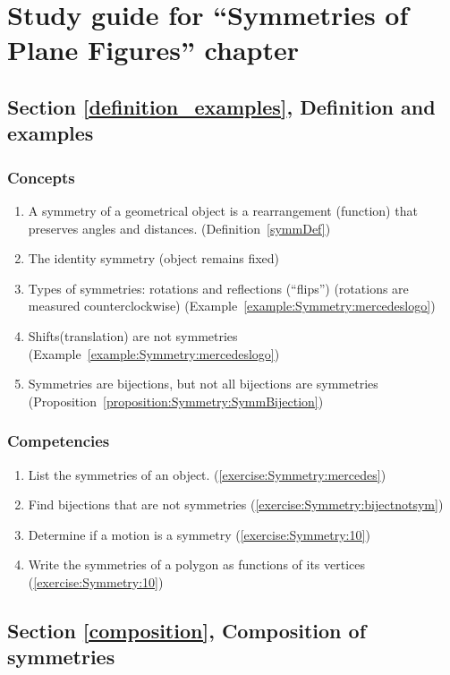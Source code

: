 \section{Study guide  for ``Symmetries of Plane Figures''  chapter}\label{sec:Symmetry:study} 


\subsection*{Section \ref{definition_examples}, Definition and examples}
\subsubsection*{Concepts}
\begin{enumerate}
\item 
A symmetry of a geometrical object is a rearrangement (function) that preserves angles and distances. (Definition~\ref{symmDef})
\item
The identity symmetry (object remains fixed)
\item
Types of symmetries: rotations and reflections (``flips'')  (rotations are measured counterclockwise) (Example~\ref{example:Symmetry:mercedeslogo})
\item
Shifts(translation) are not symmetries (Example~\ref{example:Symmetry:mercedeslogo})
\item
Symmetries are bijections, but not all bijections are symmetries (Proposition~\ref{proposition:Symmetry:SymmBijection})
\end{enumerate}

\subsubsection*{Competencies}
\begin{enumerate}
\item
List the symmetries of an object. (\ref{exercise:Symmetry:mercedes})
\item
Find bijections that are not symmetries (\ref{exercise:Symmetry:bijectnotsym})
\item
Determine if a motion is a symmetry (\ref{exercise:Symmetry:10})
\item
Write the symmetries of a polygon as functions of its vertices (\ref{exercise:Symmetry:10})
\end{enumerate}


\subsection*{Section \ref{composition}, Composition of symmetries}
